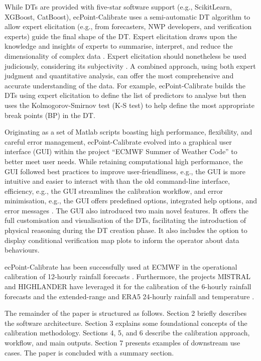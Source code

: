 \documentclass[techmemo]{ecmwfrep}%
\begin{document}
While DTs are provided with five-star software support (e.g., ScikitLearn, XGBoost, CatBoost), ecPoint-Calibrate uses a semi-automatic DT algorithm to allow expert elicitation (e.g., from forecasters, NWP developers, and verification experts) guide the final shape of the DT. Expert elicitation draws upon the knowledge and insights of experts to summarise, interpret, and reduce the dimensionality of complex data \citep{OHagan2019}. Expert elicitation should nonetheless be used judiciously, considering its subjectivity \citep{Morgan2014}. A combined approach, using both expert judgment and quantitative analysis, can offer the most comprehensive and accurate understanding of the data. For example, ecPoint-Calibrate builds the DTs using expert elicitation to define the list of predictors to analyse but then uses the Kolmogorov-Smirnov test (K-S test) to help define the most appropriate break points (BP) in the DT.

Originating as a set of Matlab scripts boasting high performance, flexibility, and careful error management, ecPoint-Calibrate evolved into a graphical user interface (GUI) within the project “ECMWF Summer of Weather Code” to better meet user needs. While retaining computational high performance, the GUI followed best practices  to improve user-friendliness, e.g., the GUI is more intuitive and easier to interact with than the old command-line interface, efficiency, e.g., the GUI streamlines the calibration workflow, and error minimisation, e.g., the GUI offers predefined options, integrated help options, and error messages \citep{Preece1994}. The GUI also introduced two main novel features. It offers the full customisation and visualisation of the DTs, facilitating the introduction of physical reasoning during the DT creation phase. It also includes the option to display conditional verification map plots to inform the operator about data behaviours.

ecPoint-Calibrate has been successfully used at ECMWF in the operational calibration of 12-hourly rainfall forecasts \citep{Hewson2019}. Furthermore, the projects MISTRAL and HIGHLANDER have leveraged it for the calibration of the 6-hourly rainfall forecasts \citep{Gascón2023} and the extended-range and ERA5 24-hourly rainfall and temperature \citep{Hewson2023}.

The remainder of the paper is structured as follows. Section 2 briefly describes the software architecture. Section 3 explains some foundational concepts of the calibration methodology. Sections 4, 5, and 6 describe the calibration approach, workflow, and main outputs. Section 7 presents examples of downstream use cases. The paper is concluded with a summary section.
\end{document}
